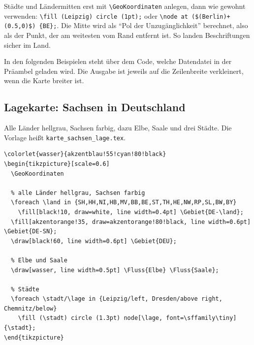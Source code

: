 \begin{merke}
	Städte und Ländermitten erst mit \texttt{\textbackslash GeoKoordinaten} anlegen, dann wie gewohnt verwenden: \texttt{\textbackslash fill (Leipzig) circle (1pt);} oder \texttt{\textbackslash node at (\$(Berlin)+(0.5,0)\$) \{BE\};}. Die Mitte wird als \enquote{Pol der Unzugänglichkeit} berechnet, also als der Punkt, der am weitesten vom Rand entfernt ist. So landen Beschriftungen sicher im Land.
\end{merke}

In den folgenden Beispielen steht über dem Code, welche Datendatei in der Präambel geladen wird. Die Ausgabe ist jeweils auf die Zeilenbreite verkleinert, wenn die Karte breiter ist.


\subsection{Lagekarte: Sachsen in Deutschland}

Alle Länder hellgrau, Sachsen farbig, dazu Elbe, Saale und drei Städte. Die Vorlage heißt \texttt{karte\_sachsen\_lage.tex}.

\begin{lstlisting}[style=latex]
% Präambel: 
\colorlet{wasser}{akzentblau!55!cyan!80!black}
\begin{tikzpicture}[scale=0.6]
  \GeoKoordinaten

  % alle Länder hellgrau, Sachsen farbig
  \foreach \land in {SH,HH,NI,HB,MV,BB,BE,ST,TH,HE,NW,RP,SL,BW,BY}
    \fill[black!10, draw=white, line width=0.4pt] \Gebiet{DE-\land};
  \fill[akzentorange!35, draw=akzentorange!80!black, line width=0.6pt] \Gebiet{DE-SN};
  \draw[black!60, line width=0.6pt] \Gebiet{DEU};

  % Elbe und Saale
  \draw[wasser, line width=0.5pt] \Fluss{Elbe} \Fluss{Saale};

  % Städte
  \foreach \stadt/\lage in {Leipzig/left, Dresden/above right, Chemnitz/below}
    \fill (\stadt) circle (1.3pt) node[\lage, font=\sffamily\tiny] {\stadt};
\end{tikzpicture}
\end{lstlisting}

